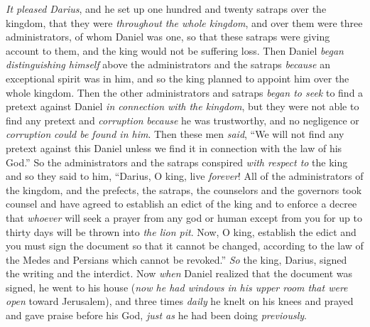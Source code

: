 \begin{biblechapter} %
 \textit{It pleased Darius}, and he set up one hundred and twenty satraps over the kingdom, that they were \textit{throughout the whole kingdom},
\verse and over them were three administrators, of whom Daniel was one, so that these satraps were giving account to them, and the king would not be suffering loss.
\verse Then Daniel \textit{began distinguishing himself} above the administrators and the satraps \textit{because} an exceptional spirit was in him, and so the king planned to appoint him over the whole kingdom.
\verse Then the other administrators and satraps \textit{began to seek} to find a pretext against Daniel \textit{in connection with the kingdom}, but they were not able to find any pretext and \textit{corruption} \textit{because} he was trustworthy, and no negligence or \textit{corruption} \textit{could be found in him}.
\verse Then these men \textit{said}, “We will not find any pretext against this Daniel unless we find it in connection with the law of his God.”
\verse So the administrators and the satraps conspired \textit{with respect to} the king and so they said to him, “Darius, O king, live \textit{forever}!
\verse All of the administrators of the kingdom, and the prefects, the satraps, the counselors and the governors took counsel and have agreed to establish an edict of the king and to enforce a decree that \textit{whoever} will seek a prayer from any god or human except from you for up to thirty days will be thrown into \textit{the lion pit}.
\verse Now, O king, establish the edict and you must sign the document so that it cannot be changed, according to the law of the Medes and Persians which cannot be revoked.”
\verse \textit{So} the king, Darius, signed the writing and the interdict.
\verse Now \textit{when} Daniel realized that the document was signed, he went to his house (\textit{now he had windows in his upper room that were open} toward Jerusalem), and three times \textit{daily} he knelt on his knees and prayed and gave praise before his God, \textit{just as} he had been doing \textit{previously}.

\end{biblechapter}
